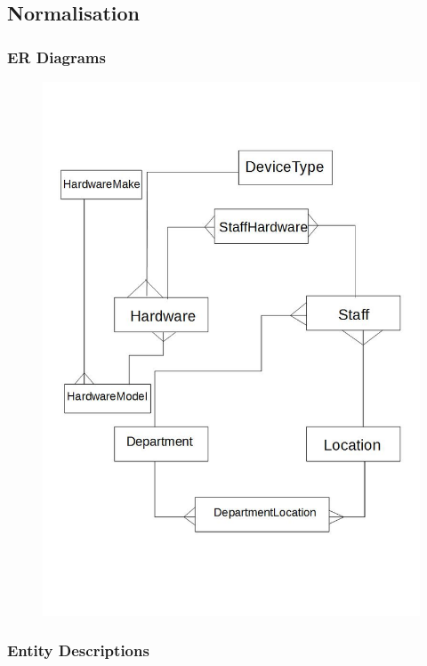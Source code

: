 \subsection{Normalisation}

\newpage

\subsubsection{ER Diagrams}

\begin{figure}[H]
\includegraphics[width=\textwidth]{ERNormalisedDiagram.jpg}
\end{figure}


\subsubsection{Entity Descriptions}


